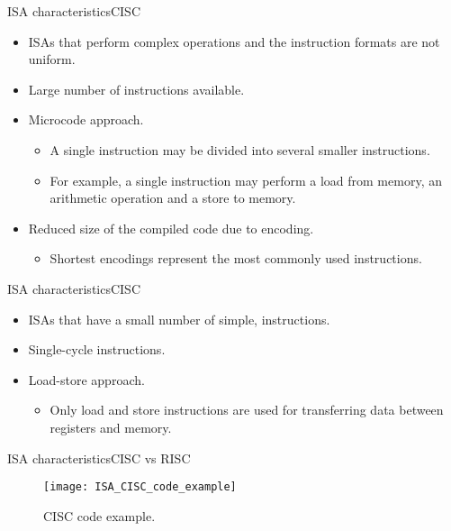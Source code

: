 \documentclass[]{slides}
\begin{document}
\begin{frame}{\acs{ISA} characteristics}{CISC}
  \begin{itemize}
    \item \acp{ISA} that perform complex operations and the instruction formats are not uniform.
    \item Large number of instructions available.
    \item Microcode approach. 
    \begin{itemize}
      \item A single instruction may be divided into several smaller instructions. 
      \item For example, a single instruction may perform a load from memory, an arithmetic operation and a store to memory.
    \end{itemize}
    \item Reduced size of the compiled code due to  encoding. 
    \begin{itemize}
      \item Shortest encodings represent the most commonly used instructions.     
    \end{itemize}

  \end{itemize}    
\end{frame}

\begin{frame}{\acs{ISA} characteristics}{CISC}
  \begin{itemize}
    \item \acp{ISA} that have a small number of simple,  instructions.
    \item Single-cycle instructions.
    \item Load-store approach. 
    \begin{itemize}
      \item Only load and store instructions are used for transferring data between registers and memory.
    \end{itemize}
  \end{itemize}     
\end{frame}

\begin{frame}{\acs{ISA} characteristics}{CISC vs RISC}
\vspace{-8pt}
\begin{figure}
\centering
\texttt{[image: ISA\_CISC\_code\_example]}
\vspace{-12pt}
\caption{CISC code example.}
\label{Figure:CISC_code}
\end{figure}    
\end{frame}
\end{document}
